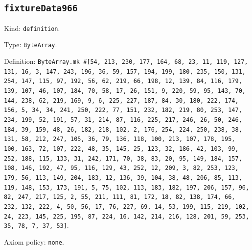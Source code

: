 \documentclass[11pt]{article}
\begin{document}
\subsection*{\texttt{fixtureData966}}
\noindent Kind: \texttt{definition}.\par
\noindent Type: \texttt{ByteArray}.\par
\noindent Definition: \texttt{ByteArray.mk \#[54, 213, 230, 177, 164, 68, 23, 11, 119, 127, 131, 16, 3, 147, 243, 196, 36, 59, 157, 194, 199, 180, 235, 150, 131, 254, 147, 115, 97, 192, 56, 62, 219, 66, 198, 12, 139, 84, 116, 179, 139, 107, 46, 107, 184, 70, 58, 17, 26, 151, 9, 220, 59, 95, 143, 70, 144, 238, 62, 219, 169, 9, 6, 225, 227, 187, 84, 30, 180, 222, 174, 156, 5, 34, 34, 241, 250, 222, 77, 151, 232, 182, 219, 80, 253, 147, 234, 199, 52, 191, 57, 31, 214, 87, 116, 225, 217, 246, 26, 50, 246, 184, 39, 159, 48, 26, 182, 218, 102, 2, 176, 254, 224, 250, 238, 38, 131, 58, 212, 247, 105, 36, 79, 136, 118, 100, 213, 107, 178, 195, 100, 163, 72, 107, 222, 48, 35, 145, 25, 123, 32, 186, 42, 103, 99, 252, 188, 115, 133, 31, 242, 171, 70, 38, 83, 20, 95, 149, 184, 157, 108, 146, 192, 47, 95, 116, 129, 43, 252, 12, 209, 3, 82, 253, 123, 179, 56, 113, 149, 204, 183, 12, 136, 39, 104, 38, 48, 206, 85, 113, 119, 148, 153, 173, 191, 5, 75, 102, 113, 183, 182, 197, 206, 157, 96, 82, 247, 217, 125, 2, 55, 211, 111, 81, 172, 18, 82, 138, 174, 66, 232, 132, 222, 4, 50, 56, 17, 76, 227, 69, 14, 53, 199, 115, 219, 102, 24, 223, 145, 225, 195, 87, 224, 16, 142, 214, 216, 128, 201, 59, 253, 35, 78, 7, 37, 53]}.\par
\noindent Axiom policy: \texttt{none}.\par
\end{document}
